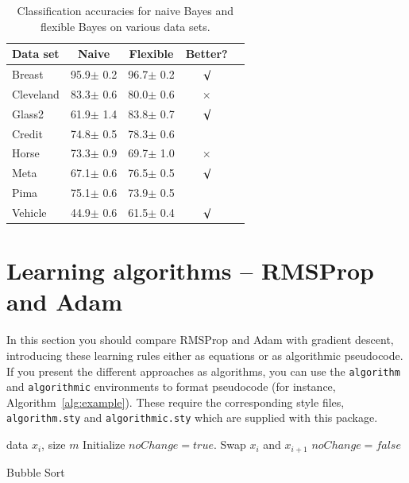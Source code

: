 \documentclass{article}
\begin{document}
\begin{table}[tb]
\vskip 3mm
\begin{center}
\begin{small}
\begin{sc}
\begin{tabular}{lcccr}
\hline
\abovespace\belowspace
Data set & Naive & Flexible & Better? \\
\hline
\abovespace
Breast    & 95.9$\pm$ 0.2& 96.7$\pm$ 0.2& $\surd$ \\
Cleveland & 83.3$\pm$ 0.6& 80.0$\pm$ 0.6& $\times$\\
Glass2    & 61.9$\pm$ 1.4& 83.8$\pm$ 0.7& $\surd$ \\
Credit    & 74.8$\pm$ 0.5& 78.3$\pm$ 0.6&         \\
Horse     & 73.3$\pm$ 0.9& 69.7$\pm$ 1.0& $\times$\\
Meta      & 67.1$\pm$ 0.6& 76.5$\pm$ 0.5& $\surd$ \\
Pima      & 75.1$\pm$ 0.6& 73.9$\pm$ 0.5&         \\
\belowspace
Vehicle   & 44.9$\pm$ 0.6& 61.5$\pm$ 0.4& $\surd$ \\
\hline
\end{tabular}
\end{sc}
\end{small}
\caption{Classification accuracies for naive Bayes and flexible 
Bayes on various data sets.}
\label{tab:sample-table}
\end{center}
\vskip -3mm
\end{table}





\section{Learning algorithms -- RMSProp and Adam}
In this section you should compare RMSProp and Adam with gradient descent, introducing these learning rules either as equations or as algorithmic pseudocode.  If you present the different approaches as algorithms, you can use the \verb+algorithm+ and \verb+algorithmic+ environments to format pseudocode (for instance, Algorithm~\ref{alg:example}). These require the corresponding style files, \verb+algorithm.sty+ and \verb+algorithmic.sty+ which are supplied with this package. 

\begin{algorithm}[ht]
\begin{algorithmic}
    data $x_i$, size $m$
   \REPEAT
   \STATE Initialize $noChange = true$.
   \STATE Swap $x_i$ and $x_{i+1}$
   \STATE $noChange = false$
   \ENDIF
   \ENDFOR
\end{algorithmic}
  \caption{Bubble Sort}
  \label{alg:example}
\end{algorithm}
\end{document}
